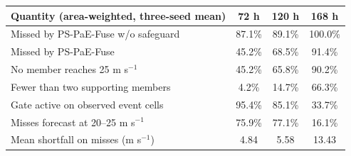 \begin{tabular}{lccc}
\hline
Quantity (area-weighted, three-seed mean) & 72 h & 120 h & 168 h \\
\hline
Missed by PS-PaE-Fuse w/o safeguard & 87.1\% & 89.1\% & 100.0\% \\
Missed by PS-PaE-Fuse & 45.2\% & 68.5\% & 91.4\% \\
No member reaches 25 m s$^{-1}$ & 45.2\% & 65.8\% & 90.2\% \\
Fewer than two supporting members & 4.2\% & 14.7\% & 66.3\% \\
Gate active on observed event cells & 95.4\% & 85.1\% & 33.7\% \\
Misses forecast at 20--25 m s$^{-1}$ & 75.9\% & 77.1\% & 16.1\% \\
Mean shortfall on misses (m s$^{-1}$) & 4.84 & 5.58 & 13.43 \\
\hline
\end{tabular}
